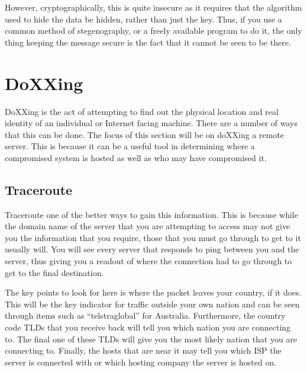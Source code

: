 		However, cryptographically, this is quite insecure as it requires that the algorithm used to hide the data be hidden, rather than just the key. 
		Thus, if you use a common method of stegenography, or a freely available program to do it, the only thing keeping the message secure is the fact that it cannot be seen to be there. 
	\section{DoXXing}
		DoXXing is the act of attempting to find out the physical location and real identity of an individual or Internet facing machine. 
		There are a number of ways that this can be done. 
		The focus of this section will be on doXXing a remote server. 
		This is because it can be a useful tool in determining where a compromised system is hosted as well as who may have compromised it. 
		\subsection{Traceroute}
			Traceroute one of the better ways to gain this information. 
			This is because while the domain name of the server that you are attempting to access may not give you the information that you require, those that you must go through to get to it usually will. 
			You will see every server that responds to ping between you and the server, thus giving you a readout of where the connection had to go through to get to the final destination. 

			The key points to look for here is where the packet leaves your country, if it does. 
			This will be the key indicator for traffic outside your own nation and can be seen through items such as ``telstraglobal'' for Australia. 
			Furthermore, the country code TLDs that you receive back will tell you which nation you are connecting to. 
			The final one of these TLDs will give you the most likely nation that you are connecting to. 
			Finally, the hosts that are near it may tell you which ISP the server is connected with or which hosting company the server is hosted on. 

